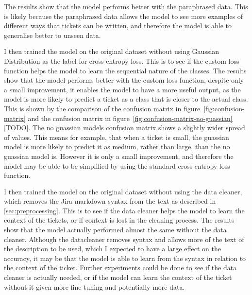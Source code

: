 \documentclass{UoYCSproject}
\begin{document}
    The results show that the model performs better with the paraphrased data.
    This is likely because the paraphrased data allows the model to see more examples of different ways that tickets can be written, and therefore the model is able to generalise better to unseen data.
    \par
    I then trained the model on the original dataset without using Gaussian Distribution as the label for cross entropy loss.
    This is to see if the custom loss function helps the model to learn the sequential nature of the classes.
    The results show that the model performs better with the custom loss function, despite only a small improvement, it enables the model to have a more useful output, as the model is more likely to predict a ticket as a class that is closer to the actual class. This is shown by the comparison of the confusion matrix in figure~\ref{fig:confusion-matrix} and the confusion matrix in figure~\ref{fig:confusion-matrix-no-guassian} [TODO]. The no guassian models confusion matrix shows a slightly wider spread of values. This means for example, that when a ticket is small, the guassian model is more likely to predict it as medium, rather than large, than the no guassian model is.
    However it is only a small improvement, and therefore the model may be able to be simplified by using the standard cross entropy loss function. \par

    I then trained the model on the original dataset without using the data cleaner, which removes the Jira markdown syntax from the text as described in \ref{sec:preprocessing}.
    This is to see if the data cleaner helps the model to learn the context of the tickets, or if context is lost in the cleaning process.
    The results show that the model actually performed almost the same without the data cleaner.
    Although the datacleaner removes syntax and allows more of the text of the description to be used, which I expected to have a large effect on the accuracy, it may be that the model is able to learn from the syntax in relation to the context of the ticket.
    Further experiments could be done to see if the data cleaner is actually needed, or if the model can learn the context of the ticket without it given more fine tuning and potentially more data.






\end{document}
